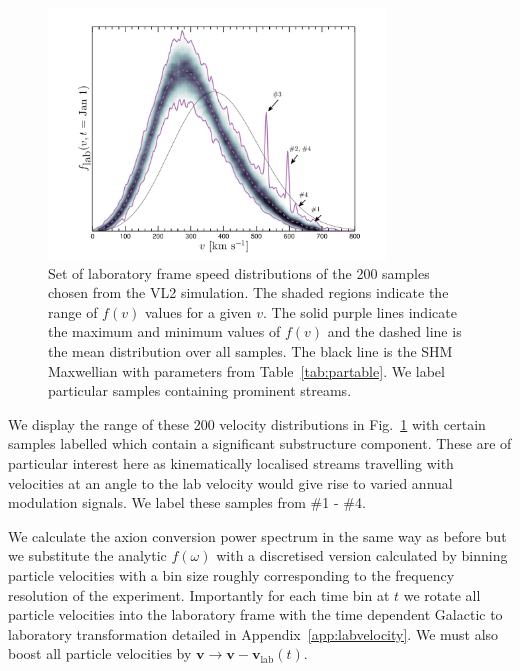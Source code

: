 \begin{figure}
\begin{center}
	\includegraphics[width=0.8\textwidth]{Figures/vl2speeddist-eps-converted-to.pdf}
    \caption[VL2 lab frame speed distributions]{Set of laboratory frame speed distributions of the 200 samples chosen from the VL2 simulation. The shaded regions indicate the range of $f(v)$ values for a given $v$. The solid purple lines indicate the maximum and minimum values of $f(v)$ and the dashed line is the mean distribution over all samples. The black line is the SHM Maxwellian with parameters from Table~\ref{tab:partable}. We label particular samples containing prominent streams.}\label{fig:vl2speeddist}
\end{center}
\end{figure}
We display the range of these 200 velocity distributions in Fig.~\ref{fig:vl2speeddist} with certain samples labelled which contain a significant substructure component. These are of particular interest here as kinematically localised streams travelling with velocities at an angle to the lab velocity would give rise to varied annual modulation signals. We label these samples from \#1 - \#4.

We calculate the axion conversion power spectrum in the same way as before but we substitute the analytic $f(\omega)$ with a discretised version calculated by binning particle velocities with a bin size roughly corresponding to the frequency resolution of the experiment. Importantly for each time bin at $t$ we rotate all particle velocities into the laboratory frame with the time dependent Galactic to laboratory transformation detailed in Appendix~\ref{app:labvelocity}. We must also boost all particle velocities by $\textbf{v} \rightarrow \textbf{v} - \textbf{v}_\textrm{lab}(t)$.

